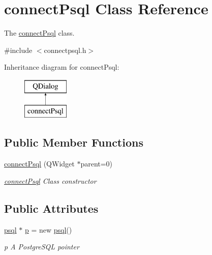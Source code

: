 \hypertarget{classconnect_psql}{}\section{connect\+Psql Class Reference}
\label{classconnect_psql}


The \hyperlink{classconnect_psql}{connect\+Psql} class.  




{\ttfamily \#include $<$connectpsql.\+h$>$}

Inheritance diagram for connect\+Psql\+:\begin{figure}[H]
\begin{center}
\leavevmode
\includegraphics[height=2.000000cm]{classconnect_psql}
\end{center}
\end{figure}
\subsection*{Public Member Functions}
\begin{DoxyCompactItemize}
\item 
\hyperlink{classconnect_psql_a15eb3b9795494a0e623d053136b1e617}{connect\+Psql} (Q\+Widget $\ast$parent=0)
\begin{DoxyCompactList}\small\item\em \hyperlink{classconnect_psql}{connect\+Psql} Class constructor \end{DoxyCompactList}\end{DoxyCompactItemize}
\subsection*{Public Attributes}
\begin{DoxyCompactItemize}
\item 
\mbox{\label{classconnect_psql_a5855dbe20b8e699563c0958462236bf2}} 
\hyperlink{classpsql}{psql} $\ast$ \hyperlink{classconnect_psql_a5855dbe20b8e699563c0958462236bf2}{p} = new \hyperlink{classpsql}{psql}()
\begin{DoxyCompactList}\small\item\em p A Postgre\+S\+QL pointer \end{DoxyCompactList}\end{DoxyCompactItemize}


